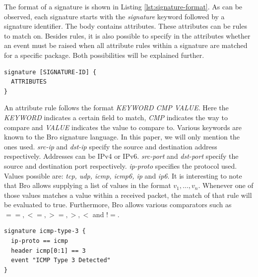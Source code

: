 The format of a signature is shown in Listing \ref{lst:signature-format}. As can be observed, each signature starts with the \emph{signature} keyword followed by a signature identifier. The body contains attributes. These attributes can be rules to match on. Besides rules, it is also possible to specify in the attributes whether an event must be raised when all attribute rules within a signature are matched for a specific package. Both possibilities will be explained further. 

\begin{lstlisting}[caption={Bro Signature Format}, label={lst:signature-format}]
signature [SIGNATURE-ID] {
  ATTRIBUTES 
}
\end{lstlisting}

An attribute rule follows the format \emph{KEYWORD CMP VALUE}. Here the \emph{KEYWORD} indicates a certain field to match, \emph{CMP} indicates the way to compare and \emph{VALUE} indicates the value to compare to.  Various keywords are known to the Bro signature language. In this paper, we will only mention the ones used. \emph{src-ip} and \emph{dst-ip} specify the source and destination address respectively. Addresses can be IPv4 or IPv6. \emph{src-port} and \emph{dst-port} specify the source and destination port respectively. \emph{ip-proto} specifies the protocol used. Values possible are: \emph{tcp, udp, icmp, icmp6, ip} and \emph{ip6}. It is interesting to note that Bro allows supplying a list of values in the format $v_1, \dots, v_n$. Whenever one of those values matches a value within a received packet, the match of that rule will be evaluated to true. Furthermore, Bro allows various comparators such as $==, <=, >=, >, <$ and $!=$.

\begin{lstlisting}[caption={Bro signature which matches all ICMP type 3 packets}, label={lst:sig-icmp}]
signature icmp-type-3 {
  ip-proto == icmp  
  header icmp[0:1] == 3
  event "ICMP Type 3 Detected"
}
\end{lstlisting} 

